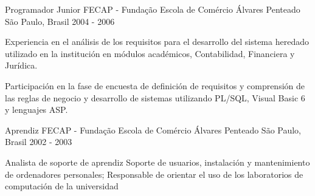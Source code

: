 \begin{cventries}
  \cventry
    {Programador Junior} %
    {FECAP - Fundação Escola de Comércio Álvares Penteado} %
    {São Paulo, Brasil} %
    {2004 - 2006} %
    {
      \begin{cvitems} %
        \item {Experiencia en el análisis de los requisitos para el desarrollo del sistema heredado utilizado en la institución en módulos académicos, Contabilidad, Financiera y Jurídica.}
        \item {Participación en la fase de encuesta de definición de requisitos y comprensión de las reglas de negocio y desarrollo de sistemas utilizando PL/SQL, Visual Basic 6 y lenguajes ASP.}
      \end{cvitems}
    }

  \cventry
    {Aprendiz} %
    {FECAP - Fundação Escola de Comércio Álvares Penteado} %
    {São Paulo, Brasil} %
    {2002 - 2003} %
    {
      \begin{cvitems} %
        \item {Analista de soporte de aprendiz
Soporte de usuarios, instalación y mantenimiento de ordenadores personales;
Responsable de orientar el uso de los laboratorios de computación de la universidad}
      \end{cvitems}
    }

\end{cventries}
